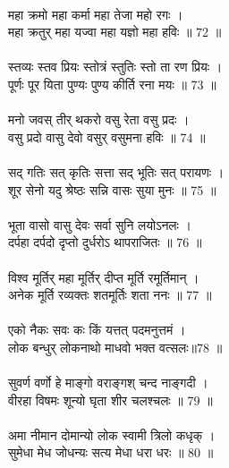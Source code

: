 \\
महा क्रमो महा कर्मा महा तेजा महो रगः ।\\
महा क्रतुर् महा यज्वा महा यज्ञो महा हविः ॥ 72 ॥\\
\\
स्तव्यः स्तव प्रियः स्तोत्रं स्तुतिः स्तो ता रण प्रियः ।\\
पूर्णः पूर यिता पुण्यः पुण्य कीर्ति रना मयः ॥ 73 ॥\\
\\
मनो जवस् तीर् थकरो वसु रेता वसु प्रदः ।\\
वसु प्रदो वासु देवो वसुर् वसुमना हविः ॥ 74 ॥\\
\\
सद् गतिः सत् कृतिः सत्ता सद् भूतिः सत् परायणः ।\\
शूर सेनो यदु श्रेष्ठः सन्नि वासः सुया मुनः ॥ 75 ॥\\
\\
भूता वासो वासु देवः सर्वा सुनि लयोऽनलः ।\\
दर्पहा दर्पदो दृप्तो दुर्धरोऽ थापराजितः ॥ 76 ॥\\
\\
विश्व मूर्तिर् महा मूर्तिर् दीप्त मूर्ति रमूर्तिमान् ।\\
अनेक मूर्ति रव्यक्तः शतमूर्तिः शता ननः ॥ 77 ॥\\
\\
एको नैकः सवः कः किं यत्तत् पदमनुत्तमं ।\\
लोक बन्धुर् लोकनाथो माधवो भक्त वत्सलः॥78 ॥\\
\\
सुवर्ण वर्णो हे माङ्गो वराङ्गश् चन्द नाङ्गदी ।\\
वीरहा विषमः शून्यो घृता शीर चलश्चलः ॥ 79 ॥\\
\\
अमा नीमान दोमान्यो लोक स्वामी त्रिलो कधृक् ।\\
सुमेधा मेध जोधन्यः सत्य मेधा धरा धरः ॥ 80 ॥\\
\\
